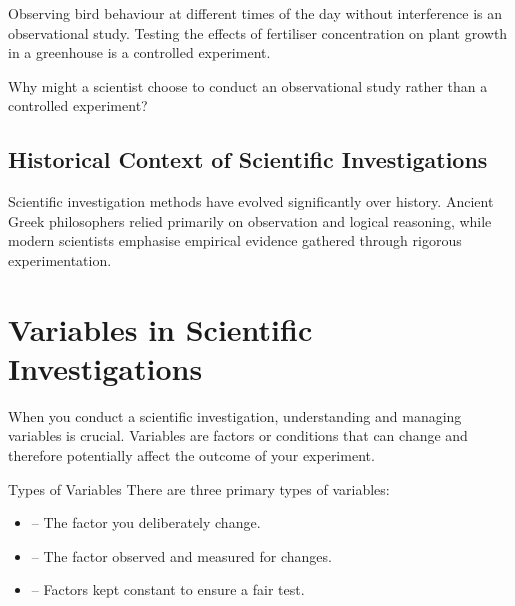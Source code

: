 \begin{example}
Observing bird behaviour at different times of the day without interference is an observational study. Testing the effects of fertiliser concentration on plant growth in a greenhouse is a controlled experiment.
\end{example}

\begin{stopandthink}
Why might a scientist choose to conduct an observational study rather than a controlled experiment?
\end{stopandthink}

\subsection{Historical Context of Scientific Investigations}

Scientific investigation methods have evolved significantly over history. Ancient Greek philosophers relied primarily on observation and logical reasoning, while modern scientists emphasise empirical evidence gathered through rigorous experimentation.


\section{Variables in Scientific Investigations}

When you conduct a scientific investigation, understanding and managing variables is crucial. Variables are factors or conditions that can change and therefore potentially affect the outcome of your experiment.

\begin{keyconcept}{Types of Variables}
There are three primary types of variables:
\begin{itemize}
    \item {} – The factor you deliberately change.
    \item {} – The factor observed and measured for changes.
    \item {} – Factors kept constant to ensure a fair test.
\end{itemize}
\end{keyconcept}

